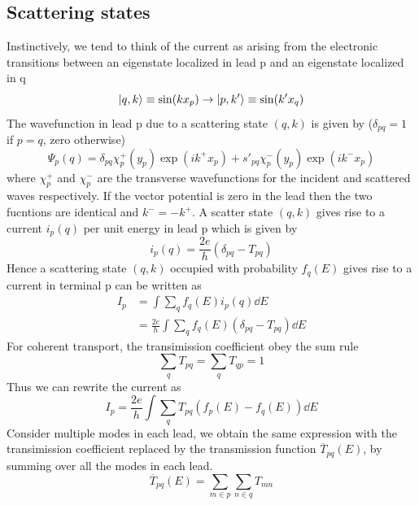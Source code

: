 \documentclass[11pt,a4paper]{book}
\theoremstyle{plain}
\theoremstyle{definition}
\theoremstyle{remark}
\begin{document}
\subsection{Scattering states}
Instinctively, we tend to think of the current as arising from the electronic transitions between an eigenstate localized in lead p and an eigenstate localized in q
\begin{equation}
    \ket{q,k} \equiv \sin(k x_p) \rightarrow \ket{p,k'} \equiv \sin(k' x_q)
\end{equation}
The wavefunction in lead p due to a scattering state $(q,k)$ is given by ($\delta_{pq} = 1$ if $p=q$, zero otherwise)
\begin{equation}
    \Psi_p(q) = \delta_{pq} \chi^+_p(y_p)\exp\left( ik^+x_p  \right) + s'_{pq} \chi^-_p(y_p)\exp\left( ik^-x_p  \right)
\end{equation}
where $\chi^+_p$ and $\chi^-_p$ are the transverse wavefunctions for the incident and scattered waves respectively. If the vector potential is zero in the lead then the two fucntions are identical and $k^-=-k^+$. A scatter state $(q,k)$ gives rise to a current $i_p(q)$ per unit energy in lead p which is given by
\begin{equation}
    i_p(q) = \frac{2 e}{h}(\delta_{pq} - T_{pq})
\end{equation}
Hence a scattering state $(q,k)$ occupied with probability $f_q(E)$ gives rise to a current in terminal p can be written as
\begin{equation}
    \begin{aligned}
        I_p 
        & = \int \sum_q f_q(E) i_p(q) \dd E \\
        & = \frac{2 e}{h} \int \sum_q f_q(E) \left( \delta_{pq} - T_{pq} \right) \dd E
    \end{aligned}
\end{equation}
For coherent transport, the transimission coefficient obey the sum rule
\begin{equation}
    \sum_q T_{pq} = \sum_q T_{qp} = 1
\end{equation}
Thus we can rewrite the current as
\begin{equation}
    I_p = \frac{2 e}{h} \int \sum_q T_{pq} (f_p(E) - f_q(E)) \dd E
\end{equation}
Consider multiple modes in each lead, we obtain the same expression with the transimission coefficient replaced by the transmission function $\overline{T}_{pq}(E)$, by summing over all the modes in each lead.
\begin{equation}
    \overline{T}_{pq}(E) = \sum_{m \in p} \sum_{n \in q} T_{mn}
\end{equation}
\end{document}
